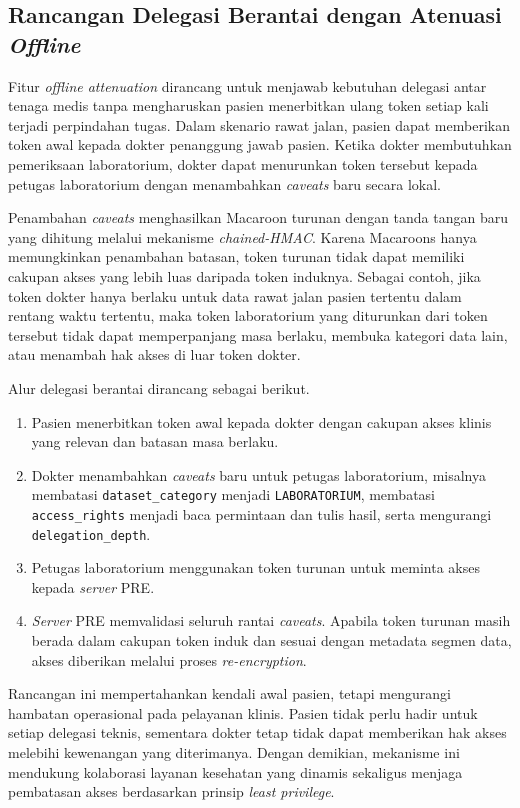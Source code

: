 \subsection{Rancangan Delegasi Berantai dengan Atenuasi \textit{Offline}}
\label{subsec:rancangan-delegasi-offline}

Fitur \textit{offline attenuation} dirancang untuk menjawab kebutuhan delegasi antar tenaga medis tanpa mengharuskan pasien menerbitkan ulang token setiap kali terjadi perpindahan tugas. Dalam skenario rawat jalan, pasien dapat memberikan token awal kepada dokter penanggung jawab pasien. Ketika dokter membutuhkan pemeriksaan laboratorium, dokter dapat menurunkan token tersebut kepada petugas laboratorium dengan menambahkan \textit{caveats} baru secara lokal.

Penambahan \textit{caveats} menghasilkan Macaroon turunan dengan tanda tangan baru yang dihitung melalui mekanisme \textit{chained-HMAC}. Karena Macaroons hanya memungkinkan penambahan batasan, token turunan tidak dapat memiliki cakupan akses yang lebih luas daripada token induknya. Sebagai contoh, jika token dokter hanya berlaku untuk data rawat jalan pasien tertentu dalam rentang waktu tertentu, maka token laboratorium yang diturunkan dari token tersebut tidak dapat memperpanjang masa berlaku, membuka kategori data lain, atau menambah hak akses di luar token dokter.

Alur delegasi berantai dirancang sebagai berikut.

\begin{enumerate}[leftmargin=*]
	\item Pasien menerbitkan token awal kepada dokter dengan cakupan akses klinis yang relevan dan batasan masa berlaku.
	\item Dokter menambahkan \textit{caveats} baru untuk petugas laboratorium, misalnya membatasi \texttt{dataset\_category} menjadi \texttt{LABORATORIUM}, membatasi \texttt{access\_rights} menjadi baca permintaan dan tulis hasil, serta mengurangi \texttt{delegation\_depth}.
	\item Petugas laboratorium menggunakan token turunan untuk meminta akses kepada \textit{server} PRE.
	\item \textit{Server} PRE memvalidasi seluruh rantai \textit{caveats}. Apabila token turunan masih berada dalam cakupan token induk dan sesuai dengan metadata segmen data, akses diberikan melalui proses \textit{re-encryption}.
\end{enumerate}

Rancangan ini mempertahankan kendali awal pasien, tetapi mengurangi hambatan operasional pada pelayanan klinis. Pasien tidak perlu hadir untuk setiap delegasi teknis, sementara dokter tetap tidak dapat memberikan hak akses melebihi kewenangan yang diterimanya. Dengan demikian, mekanisme ini mendukung kolaborasi layanan kesehatan yang dinamis sekaligus menjaga pembatasan akses berdasarkan prinsip \textit{least privilege}.
